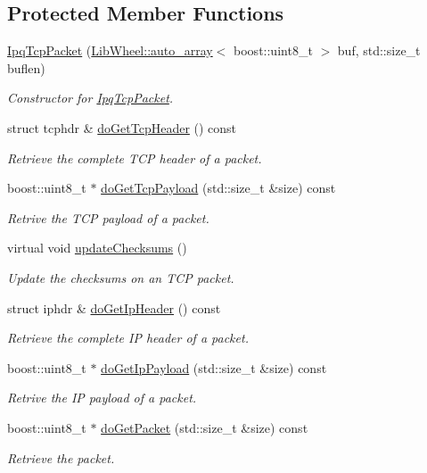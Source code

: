 \subsection*{\-Protected \-Member \-Functions}
\begin{DoxyCompactItemize}
\item 
\hyperlink{classIPQ_1_1IpqTcpPacket_a3b8faa690b49ce88bbc83cca7831f92e}{\-Ipq\-Tcp\-Packet} (\hyperlink{classLibWheel_1_1auto__array}{\-Lib\-Wheel\-::auto\-\_\-array}$<$ boost\-::uint8\-\_\-t $>$ buf, std\-::size\-\_\-t buflen)
\begin{DoxyCompactList}\small\item\em \-Constructor for \hyperlink{classIPQ_1_1IpqTcpPacket}{\-Ipq\-Tcp\-Packet}. \end{DoxyCompactList}\item 
struct tcphdr \& \hyperlink{classIPQ_1_1IpqTcpPacket_afa068ad5cdd7b67ad42acc2377a979ce}{do\-Get\-Tcp\-Header} () const 
\begin{DoxyCompactList}\small\item\em \-Retrieve the complete \-T\-C\-P header of a packet. \end{DoxyCompactList}\item 
boost\-::uint8\-\_\-t $\ast$ \hyperlink{classIPQ_1_1IpqTcpPacket_ae647a5597a784ec88cdc2091457d0607}{do\-Get\-Tcp\-Payload} (std\-::size\-\_\-t \&size) const 
\begin{DoxyCompactList}\small\item\em \-Retrive the \-T\-C\-P payload of a packet. \end{DoxyCompactList}\item 
virtual void \hyperlink{classIPQ_1_1IpqTcpPacket_aa3c42606d262b29f2b4bef459f34dd90}{update\-Checksums} ()
\begin{DoxyCompactList}\small\item\em \-Update the checksums on an \-T\-C\-P packet. \end{DoxyCompactList}\item 
struct iphdr \& \hyperlink{classIPQ_1_1IpqIpPacket_a6be0afa1f616cbe7722ef817a65e24dc}{do\-Get\-Ip\-Header} () const 
\begin{DoxyCompactList}\small\item\em \-Retrieve the complete \-I\-P header of a packet. \end{DoxyCompactList}\item 
boost\-::uint8\-\_\-t $\ast$ \hyperlink{classIPQ_1_1IpqIpPacket_ab78709e0712a1912d19114f815407303}{do\-Get\-Ip\-Payload} (std\-::size\-\_\-t \&size) const 
\begin{DoxyCompactList}\small\item\em \-Retrive the \-I\-P payload of a packet. \end{DoxyCompactList}\item 
boost\-::uint8\-\_\-t $\ast$ \hyperlink{classIPQ_1_1IpqPacket_a7b8f489a9cec36058eaee43f6566a999}{do\-Get\-Packet} (std\-::size\-\_\-t \&size) const 
\begin{DoxyCompactList}\small\item\em \-Retrieve the packet. \end{DoxyCompactList}\end{DoxyCompactItemize}
